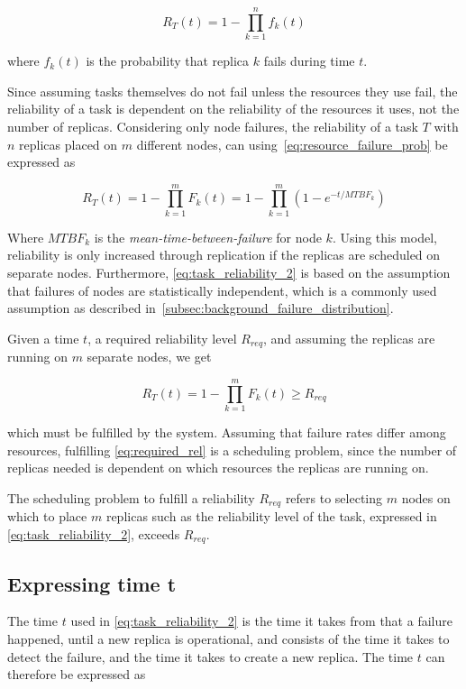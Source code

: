 \documentclass{cslthse-msc}
\begin{document}
\begin{equation} \label{eq:task_reliability}
R_{T}(t) = 1 - \prod\limits_{k=1}^n f_{k}(t)
\end{equation}

where $f_{k}(t)$ is the probability that replica $k$ fails during time $t$. 

Since assuming tasks themselves do not fail unless the resources they use fail, the reliability of a task is dependent on the reliability of the resources it uses, not the number of replicas. Considering only node failures, the reliability of a task $T$ with $n$ replicas placed on $m$ different nodes, can using~\cref{eq:resource_failure_prob} be expressed as

\begin{equation} \label{eq:task_reliability_2}
R_{T}(t) = 1 - \prod\limits_{k=1}^m F_{k}(t) = 1 - \prod\limits_{k=1}^m (1- e^{-t/MTBF_k})
\end{equation}

Where $MTBF_k$ is the \emph{mean-time-between-failure} for node $k$. Using this model, reliability is only increased through replication if the replicas are scheduled on separate nodes. Furthermore, \cref{eq:task_reliability_2} is based on the assumption that failures of nodes are statistically independent, which is a commonly used assumption as described in~\cref{subsec:background_failure_distribution}.

Given a time $t$, a required reliability level $R_{req}$, and assuming the replicas are running on $m$ separate nodes, we get

\begin{equation} \label{eq:required_rel}
R_T(t) = 1 - \prod\limits_{k=1}^m F_{k}(t) \geq R_{req}
\end{equation}

which must be fulfilled by the system. Assuming that failure rates differ among resources, fulfilling \cref{eq:required_rel} is a scheduling problem, since the number of replicas needed is dependent on which resources the replicas are running on.

The scheduling problem to fulfill a reliability $R_{req}$ refers to selecting $m$ nodes on which to place $m$ replicas such as the reliability level of the task, expressed in \cref{eq:task_reliability_2}, exceeds $R_{req}$.

\subsection{Expressing time t} \label{sec:design_time_t}
The time $t$ used in \cref{eq:task_reliability_2} is the time it takes from that a failure happened, until a new replica is operational, and consists of the time it takes to detect the failure, and the time it takes to create a new replica. The time $t$ can therefore be expressed as 
\end{document}

